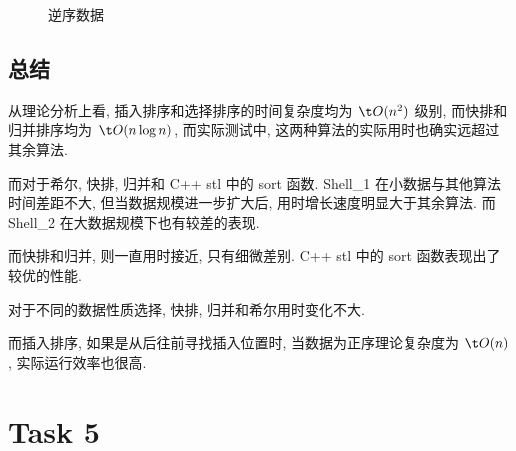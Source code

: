 \begin{figure}[H]    %
		\centering            %
		\caption{逆序数据}    %
		
\end{figure}

\subsection{总结}

从理论分析上看, 插入排序和选择排序的时间复杂度均为 $\t O(n^2)$ 级别, 而快排和归并排序均为 $\t O(n\log n)$, 而实际测试中, 这两种算法的实际用时也确实远超过其余算法.

而对于希尔, 快排, 归并和 C++ stl 中的 sort 函数. Shell\_1 在小数据与其他算法时间差距不大, 但当数据规模进一步扩大后, 用时增长速度明显大于其余算法. 而 Shell\_2 在大数据规模下也有较差的表现.

而快排和归并, 则一直用时接近, 只有细微差别. C++ stl 中的 sort 函数表现出了较优的性能.

对于不同的数据性质选择, 快排, 归并和希尔用时变化不大. 

而插入排序, 如果是从后往前寻找插入位置时, 当数据为正序理论复杂度为 $\t O(n)$, 实际运行效率也很高.

\section{Task 5}

